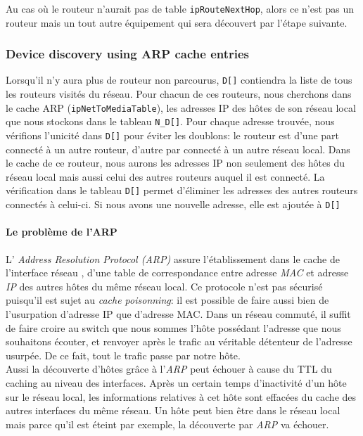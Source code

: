 Au cas où le routeur n'aurait pas de table \texttt{ipRouteNextHop}, alors ce n'est pas un routeur mais un tout autre équipement qui sera découvert par l'étape suivante.
 
\subsubsection{Device discovery using ARP cache entries}
Lorsqu'il n'y aura plus de routeur non parcourus,  \texttt{D[]} contiendra la liste de tous les routeurs visités du réseau. Pour chacun de ces routeurs, nous cherchons dans le cache ARP (\texttt{ipNetToMediaTable}), les adresses IP des hôtes de son réseau local que nous stockons dans le tableau \texttt{N\_D[]}. Pour chaque adresse trouvée, nous vérifions l'unicité dans \texttt{D[]} pour éviter les doublons: le routeur est d'une part connecté à un autre routeur, d'autre par connecté à un autre réseau local. Dans le cache de ce routeur, nous aurons les adresses IP  non seulement des hôtes du réseau local mais aussi celui des autres routeurs auquel il est connecté. La vérification dans le tableau \texttt{D[]} permet d'éliminer les adresses des autres routeurs connectés à celui-ci. Si nous avons une nouvelle adresse, elle est ajoutée à \texttt{D[]}

\paragraph{Le problème de l'ARP\\}
L' \emph{Address Resolution Protocol (ARP)} assure l'établissement dans le cache de l'interface réseau , d'une table de correspondance entre adresse \emph{MAC} et adresse \emph{IP} des autres hôtes du même réseau local. Ce protocole n'est pas sécurisé puisqu'il est sujet au \emph{cache poisonning}: il est possible de faire aussi bien de l'usurpation d'adresse IP que d'adresse MAC. Dans un réseau commuté, il suffit de faire croire au switch que nous sommes l'hôte possédant l'adresse que nous souhaitons écouter, et renvoyer après le trafic au véritable détenteur de l'adresse usurpée. De ce fait, tout le trafic passe par notre hôte.\\
Aussi la découverte d'hôtes grâce à l'\emph{ARP} peut échouer à cause du TTL du caching au niveau des interfaces. Après un certain temps d'inactivité d'un hôte sur le réseau local, les informations relatives à cet hôte sont effacées du cache des autres interfaces du même réseau. Un hôte peut bien être dans le réseau local mais parce qu'il est éteint par exemple, la découverte par \emph{ARP} va échouer.\\


